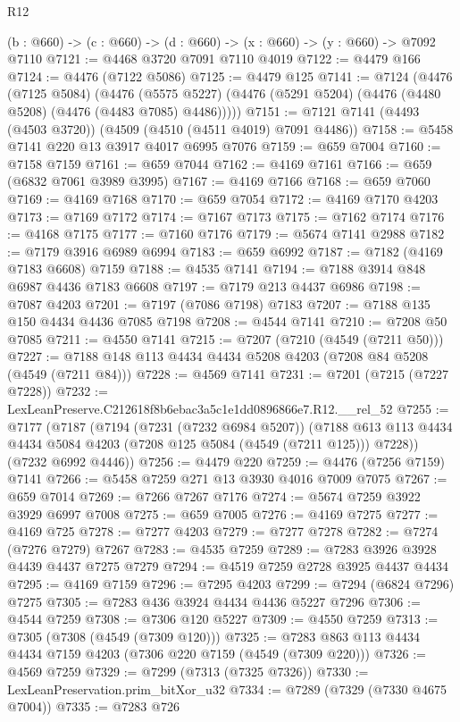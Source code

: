 \begin{lexlean}{R12}
\begin{coremodule}
  (b : @660) -> (c : @660) -> (d : @660) -> (x : @660) -> (y : @660) -> @7092 @7110
@7121 := @4468 @3720 @7091 @7110 @4019
@7122 := @4479 @166
@7124 := @4476 (@7122 @5086)
@7125 := @4479 @125
@7141 := @7124
    (@4476
      (@7125 @5084)
      (@4476 (@5575 @5227) (@4476 (@5291 @5204) (@4476 (@4480 @5208) (@4476 (@4483 @7085) @4486)))))
@7151 := @7121 @7141 (@4493 (@4503 @3720)) (@4509 (@4510 (@4511 @4019) @7091 @4486))
@7158 := @5458 @7141 @220 @13 @3917 @4017 @6995 @7076
@7159 := @659 @7004
@7160 := @7158 @7159
@7161 := @659 @7044
@7162 := @4169 @7161
@7166 := @659 (@6832 @7061 @3989 @3995)
@7167 := @4169 @7166
@7168 := @659 @7060
@7169 := @4169 @7168
@7170 := @659 @7054
@7172 := @4169 @7170 @4203
@7173 := @7169 @7172
@7174 := @7167 @7173
@7175 := @7162 @7174
@7176 := @4168 @7175
@7177 := @7160 @7176
@7179 := @5674 @7141 @2988
@7182 := @7179 @3916 @6989 @6994
@7183 := @659 @6992
@7187 := @7182 (@4169 @7183 @6608) @7159
@7188 := @4535 @7141
@7194 := @7188 @3914 @848 @6987 @4436 @7183 @6608
@7197 := @7179 @213 @4437 @6986
@7198 := @7087 @4203
@7201 := @7197 (@7086 @7198) @7183
@7207 := @7188 @135 @150 @4434 @4436 @7085 @7198
@7208 := @4544 @7141
@7210 := @7208 @50 @7085
@7211 := @4550 @7141
@7215 := @7207 (@7210 (@4549 (@7211 @50)))
@7227 := @7188 @148 @113 @4434 @4434 @5208 @4203 (@7208 @84 @5208 (@4549 (@7211 @84)))
@7228 := @4569 @7141
@7231 := @7201 (@7215 (@7227 @7228))
@7232 := LexLeanPreserve.C212618f8b6ebac3a5c1e1dd0896866e7.R12.__rel_52
@7255 := @7177
    (@7187
      (@7194
        (@7231 (@7232 @6984 @5207))
        (@7188 @613 @113 @4434 @4434 @5084 @4203 (@7208 @125 @5084 (@4549 (@7211 @125))) @7228))
      (@7232 @6992 @4446))
@7256 := @4479 @220
@7259 := @4476 (@7256 @7159) @7141
@7266 := @5458 @7259 @271 @13 @3930 @4016 @7009 @7075
@7267 := @659 @7014
@7269 := @7266 @7267 @7176
@7274 := @5674 @7259 @3922 @3929 @6997 @7008
@7275 := @659 @7005
@7276 := @4169 @7275
@7277 := @4169 @725
@7278 := @7277 @4203
@7279 := @7277 @7278
@7282 := @7274 (@7276 @7279) @7267
@7283 := @4535 @7259
@7289 := @7283 @3926 @3928 @4439 @4437 @7275 @7279
@7294 := @4519 @7259 @2728 @3925 @4437 @4434
@7295 := @4169 @7159
@7296 := @7295 @4203
@7299 := @7294 (@6824 @7296) @7275
@7305 := @7283 @436 @3924 @4434 @4436 @5227 @7296
@7306 := @4544 @7259
@7308 := @7306 @120 @5227
@7309 := @4550 @7259
@7313 := @7305 (@7308 (@4549 (@7309 @120)))
@7325 := @7283 @863 @113 @4434 @4434 @7159 @4203 (@7306 @220 @7159 (@4549 (@7309 @220)))
@7326 := @4569 @7259
@7329 := @7299 (@7313 (@7325 @7326))
@7330 := LexLeanPreservation.prim_bitXor_u32
@7334 := @7289 (@7329 (@7330 @4675 @7004))
@7335 := @7283 @726

\end{coremodule}
\end{lexlean}
